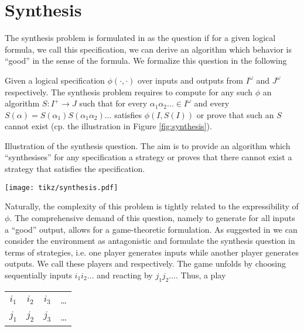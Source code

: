 \chapter{Synthesis}
\label{chapter:synthesis}
The synthesis problem is formulated in \cite{Church} as the question if for a 
given logical formula, we call this specification, we can derive an algorithm
which behavior is \enquote{good} in the sense of the formula. We formalize this
question in the following
\begin{definition}
  Given a logical specification  $\phi(\cdot, \cdot)$ over inputs and 
  outputs from $I^{\omega}$ and $J^{\omega}$ respectively. The synthesis 
  problem requires to compute for any such $\phi$ an algorithm 
  $S:I^{+}\rightarrow J$ such that for every 
  $\alpha_{1}\alpha_{2}\dots\in I^{\omega}$ and every 
  $S(\alpha) = S(\alpha_{1})S(\alpha_{1}\alpha_{2})\dots$ satisfies 
  $\phi(I, S(I))$ or prove that such an $S$ cannot exist (cp. the 
  illustration in Figure \ref{fig:synthesis}).
\end{definition}
\begin{drawing}
  \caption{Illustration of the synthesis question. The aim is to provide an 
  algorithm which \enquote{synthesises} for any specification a strategy or 
  proves that there cannot exist a strategy that satisfies the specification.}
  \label{fig:synthesis}
  \begin{center}
    \texttt{[image: tikz/synthesis.pdf]}
  \end{center}
\end{drawing}
Naturally, the complexity of this problem is tightly related to the 
expressibility of $\phi$. The comprehensive demand of this question, namely
to generate for all inputs a \enquote{good} output, allows for a
game-theoretic formulation. As suggested in \cite{SeqCondStrat} we can consider
the environment as antagonistic and formulate the synthesis question in terms
of strategies, i.e. one player generates inputs while another player generates
outputs. We call these players  and \outputp{} respectively. The game
unfolds by  choosing sequentially inputs $i_{1}i_{2}\dots$ and 
\outputp{} reacting by $j_{1}j_{2}\dots$. Thus, a play
\begin{center}
  \begin{tabular}{cccc}
    $i_{1}$ & $i_{2}$ & $i_{3}$ & \dots\\
    $j_{1}$ & $j_{2}$ & $j_{3}$ & \dots
  \end{tabular}
\end{center}
